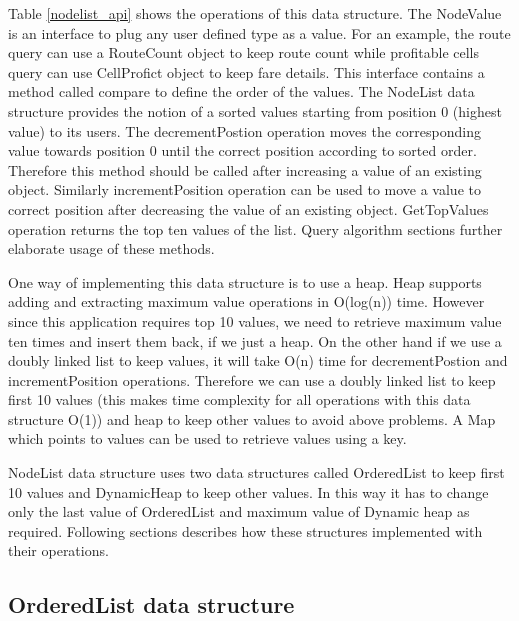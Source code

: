 Table \ref{nodelist_api} shows the operations of this data structure. The NodeValue is an interface to plug any user defined type as a value. For an example, the route query can use a RouteCount object to keep route count while profitable cells query can use CellProfict object to keep fare details. This interface contains a method called compare to define the order of the values. The NodeList data structure provides the notion of a sorted values starting from position 0 (highest value) to its users. The decrementPostion operation moves the corresponding value towards position 0 until the correct position according to sorted order. Therefore this method should be called after increasing a value of an existing object. Similarly incrementPosition operation can be used to move a value to correct position after decreasing the value of an existing object. GetTopValues operation returns the top ten values of the list. Query algorithm sections further elaborate usage of these methods.

One way of implementing this data structure is to use a heap. Heap supports adding and extracting maximum value operations in O(log(n)) time. However since this application requires top 10 values, we need to retrieve maximum value ten times and insert them back, if we just a heap. On the other hand if we use a doubly linked list to keep values, it will take O(n) time for  decrementPostion and   incrementPosition operations. Therefore we can use a doubly linked list to keep first 10 values (this makes time complexity for all operations with this data structure O(1)) and heap to keep other values to avoid above problems.  A Map which points to values can be used to retrieve values using a key.

NodeList data structure uses two data structures called OrderedList to keep first 10 values and DynamicHeap to keep other values. In this way it has to change only the last value of OrderedList and maximum value of Dynamic heap as required. Following sections describes how these structures implemented with their operations.

\subsection{OrderedList data structure}

